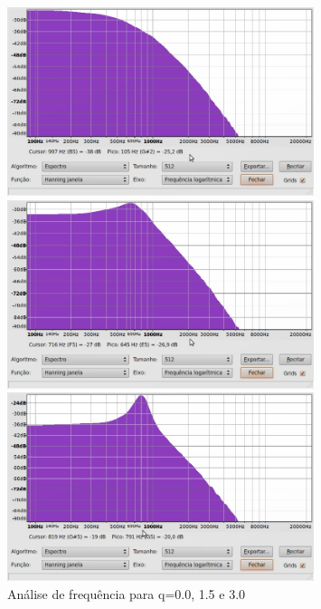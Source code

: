 \documentclass{article}
\begin{document}
\begin{figure}
  \centering
\parbox{1.5in}{
    \centering
    \includegraphics[width=0.8\textwidth,natwidth=610,natheight=642]{q0.jpg}
    }%
\qquad	  
\parbox{1.5in}{
      \centering
      \includegraphics[width=0.8\textwidth,natwidth=610,natheight=642]{q15.jpg}
      }%
\qquad
\parbox{1.5in}{
      \centering
      \includegraphics[width=0.8\textwidth,natwidth=610,natheight=642]{q3.jpg}
      }%

  \caption{Análise de frequência para q=0.0, 1.5 e 3.0}
  \label{fig:qs}
\end{figure}
\end{document}
